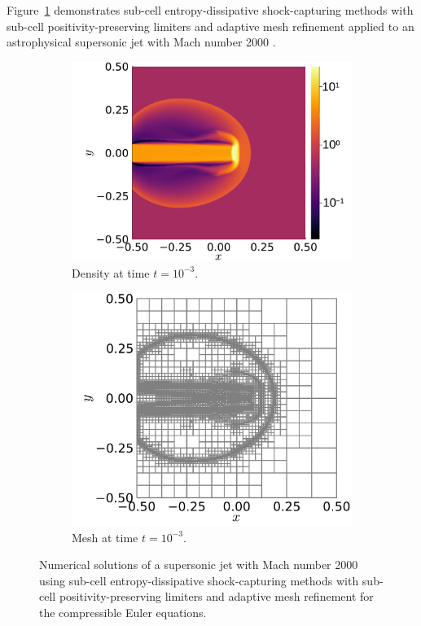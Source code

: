 \documentclass[hidelinks]{juliacon} %
\begin{document}
Figure~\ref{fig:jet} demonstrates sub-cell entropy-dissipative shock-capturing
methods with sub-cell positivity-preserving limiters and adaptive mesh refinement applied
to an astrophysical supersonic jet with Mach number 2000 \cite{liu2021oscillation}.
\begin{figure}[!h]
\vspace{-0.7em}
  \begin{subfigure}{0.52\linewidth}
    \includegraphics[width=\textwidth]{../figures/jet_density}
    \caption{Density at time $t = 10^{-3}$.}
  \end{subfigure}%
  \hspace*{\fill}
  \begin{subfigure}{0.46\linewidth}
    \includegraphics[width=\textwidth]{../figures/jet_mesh}
    \caption{Mesh at time $t = 10^{-3}$.}
  \end{subfigure}%
  \caption{Numerical solutions of a supersonic jet with Mach number 2000 using
           sub-cell entropy-dissipative shock-capturing methods with sub-cell positivity-preserving
           limiters and adaptive mesh refinement for the compressible Euler equations.}
  \label{fig:jet}
\vspace{-0.7em}
\end{figure}
\end{document}
